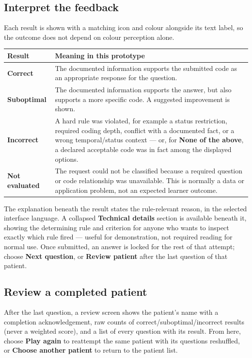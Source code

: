 \documentclass[11pt,a4paper]{article}
\begin{document}
\subsection{Interpret the feedback}

Each result is shown with a matching icon and colour alongside its text
label, so the outcome does not depend on colour perception alone.

\begin{tabularx}{\textwidth}{@{}>{\bfseries}p{28mm}X@{}}
\toprule
Result & Meaning in this prototype \\
\midrule
Correct & The documented information supports the submitted code as an
appropriate response for the question. \\
Suboptimal & The documented information supports the answer, but also
supports a more specific code. A suggested improvement is shown. \\
Incorrect & A hard rule was violated, for example a status restriction,
required coding depth, conflict with a documented fact, or a wrong
temporal/status context --- or, for \textbf{None of the above}, a declared
acceptable code was in fact among the displayed options. \\
Not evaluated & The request could not be classified because a required
question or code relationship was unavailable. This is normally a data or
application problem, not an expected learner outcome. \\
\bottomrule
\end{tabularx}

The explanation beneath the result states the rule-relevant reason, in the
selected interface language. A collapsed \textbf{Technical details}
section is available beneath it, showing the determining rule and
criterion for anyone who wants to inspect exactly which rule fired ---
useful for demonstration, not required reading for normal use. Once
submitted, an answer is locked for the rest of that attempt; choose
\textbf{Next question}, or \textbf{Review patient} after the last question
of that patient.

\subsection{Review a completed patient}

After the last question, a review screen shows the patient's name with a
completion acknowledgement, raw counts of correct/suboptimal/incorrect
results (never a weighted score), and a list of every question with its
result. From here, choose \textbf{Play again} to reattempt the same
patient with its questions reshuffled, or \textbf{Choose another patient}
to return to the patient list.
\end{document}
